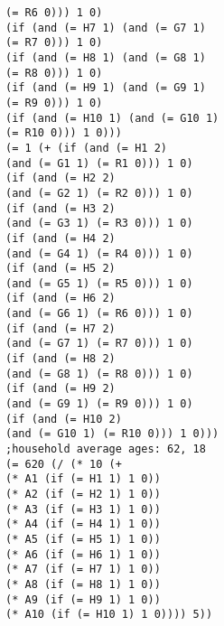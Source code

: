 \documentclass[5p,times,11pt]{elsarticle}
\begin{document}
\begin{verbatim}
(= R6 0))) 1 0)
(if (and (= H7 1) (and (= G7 1)
(= R7 0))) 1 0)
(if (and (= H8 1) (and (= G8 1)
(= R8 0))) 1 0)
(if (and (= H9 1) (and (= G9 1)
(= R9 0))) 1 0)
(if (and (= H10 1) (and (= G10 1)
(= R10 0))) 1 0)))
(= 1 (+ (if (and (= H1 2)
(and (= G1 1) (= R1 0))) 1 0)
(if (and (= H2 2)
(and (= G2 1) (= R2 0))) 1 0)
(if (and (= H3 2)
(and (= G3 1) (= R3 0))) 1 0)
(if (and (= H4 2)
(and (= G4 1) (= R4 0))) 1 0)
(if (and (= H5 2)
(and (= G5 1) (= R5 0))) 1 0)
(if (and (= H6 2)
(and (= G6 1) (= R6 0))) 1 0)
(if (and (= H7 2)
(and (= G7 1) (= R7 0))) 1 0)
(if (and (= H8 2)
(and (= G8 1) (= R8 0))) 1 0)
(if (and (= H9 2)
(and (= G9 1) (= R9 0))) 1 0)
(if (and (= H10 2)
(and (= G10 1) (= R10 0))) 1 0)))
;household average ages: 62, 18
(= 620 (/ (* 10 (+
(* A1 (if (= H1 1) 1 0))
(* A2 (if (= H2 1) 1 0))
(* A3 (if (= H3 1) 1 0))
(* A4 (if (= H4 1) 1 0))
(* A5 (if (= H5 1) 1 0))
(* A6 (if (= H6 1) 1 0))
(* A7 (if (= H7 1) 1 0))
(* A8 (if (= H8 1) 1 0))
(* A9 (if (= H9 1) 1 0))
(* A10 (if (= H10 1) 1 0)))) 5))

\end{verbatim}
\end{document}
